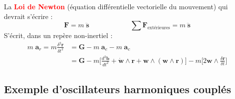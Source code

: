 \documentclass[a4paper]{article}
\begin{document}
La \textcolor{red}{\textbf{Loi de Newton}} (équation différentielle vectorielle du mouvement) qui devrait s'écrire : 
\[ \textbf{F} = m \; \ddot{\textbf{s}} \qquad \qquad \qquad \sum \textbf{F}_{\text{extérieures}} = m \; \ddot{\textbf{s}} \]
S'écrit, dans un repère non-inertiel : 
\[ \begin{aligned} m \; \textbf{a}_r = m \frac{\delta^2 \textbf{r}}{\delta t^2} &= \textbf{G} - m \; \textbf{a}_e - m \; \textbf{a}_c \\ &= \textbf{G} - m \Big[ \frac{d^2 \textbf{b}}{d t^2} + \dot{\textbf{w}} \wedge \textbf{r} + \textbf{w} \wedge (\textbf{w} \wedge \textbf{r}) \Big] - m \Big[ 2 \textbf{w} \wedge \frac{\delta \textbf{r}}{\delta t} \Big] \end{aligned} \]






\subsection{Exemple d'oscillateurs harmoniques couplés}
\end{document}
